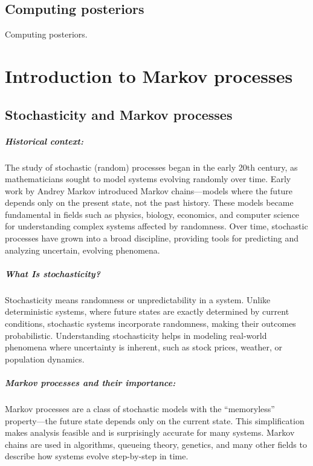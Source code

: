 \documentclass{book}
\begin{document}
\newpage

\section{Computing posteriors}
Computing posteriors.



\chapter{Introduction to Markov processes}

\section{Stochasticity and Markov processes}

\paragraph{Historical context:}
The study of stochastic (random) processes began in the early 20th century, as mathematicians sought to model systems evolving randomly over time. Early work by Andrey Markov introduced Markov chains—models where the future depends only on the present state, not the past history. These models became fundamental in fields such as physics, biology, economics, and computer science for understanding complex systems affected by randomness. Over time, stochastic processes have grown into a broad discipline, providing tools for predicting and analyzing uncertain, evolving phenomena.

\paragraph{What Is stochasticity?}
Stochasticity means randomness or unpredictability in a system. Unlike deterministic systems, where future states are exactly determined by current conditions, stochastic systems incorporate randomness, making their outcomes probabilistic. Understanding stochasticity helps in modeling real-world phenomena where uncertainty is inherent, such as stock prices, weather, or population dynamics.

\paragraph{Markov processes and their importance:}
Markov processes are a class of stochastic models with the “memoryless” property—the future state depends only on the current state. This simplification makes analysis feasible and is surprisingly accurate for many systems. Markov chains are used in algorithms, queueing theory, genetics, and many other fields to describe how systems evolve step-by-step in time.\\
\end{document}
